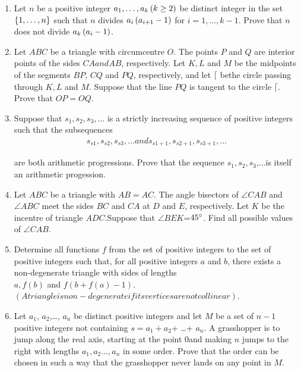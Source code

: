 \documentclass[12pt,-letter paper]{article}                       \usepackage{gvv}
\begin{document}
\begin{enumerate}
\item Let $n$ be a positive integer $a_{1},\dots,a_{k}\left(k\geq 2\right)$ be distinct integer in the set $\left\{1,\dots, n\right\}$ such that $n$ divides $a_{i} \left(a_{i+1}-1\right)$ for $i=1,\dots, k-1$. Prove that $n$ does not divide $ a_{k} \left(a_{i}-1\right)$.
\item Let $ABC$ be a triangle with circumcentre $O$. The points $P$ and $Q$ are interior points of the sides $CA and AB$, respectively. Let $K,L$ and $M$ be the midpoints of the segments $BP$, $CQ$ and $PQ$, respectively, and let $\lceil$ bethe circle passing through $K,L$ and $M$. Suppose that the line $PQ$ is tangent to the circle $\lceil$. Prove that $OP=OQ$.
\item Suppose that $s_{1}, s_{2}, s_{3},\dots $ is a strictly increasing sequence of positive integers such that the subsequences	\begin{align}
	s_{s1}, s_{s2}, s_{s3},\dots and s_{s1+1}, s_{s2+1}, s_{s3+1},\dots
	\end{align}
	   
are both arithmetic progressions. Prove that the sequence $s_1,s_2,s_3$,...is itself an arithmetic progession.
\item Let $ABC$ be a triangle with $AB=AC$. The angle bisectors of $\angle CAB$ and $\angle ABC$ meet the sides $BC$ and $CA$ at $D$ and $E$, respectively. Let $K$ be the incentre of triangle $ADC$.Suppose that $\angle BEK$=$45\degree$. Find all possible values of $\angle CAB$.
\item  Determine all functions $f$ from the set of positive integers to the set of positive integers
such that, for all positive integers $a$ and $b$, there exists a non-degenerate triangle with sides of lengths
		\\$a, f (b)$ and $f (b+f(a)-1).$ \\
		$(A triangle is non-degenerate if its vertices are not collinear)$.
\item Let $a_{1}$, $a_{2}$,\dots, $a_{n}$ be distinct positive integers and let $M$ be a set of $n-1$ positive integers not containing $s = a_{1}+a_{2}$+ \dots + $a_{n}$. A grasshopper is to jump along the real axis, starting at the point 0and making $n$ jumps to the right with lengths $a_{1}, a_{2}\dots,a_{n}$ in some order. Prove that the order can be chosen in such a way that the grasshopper never lands on any point in $M$.
\end{enumerate}
\end{document}
